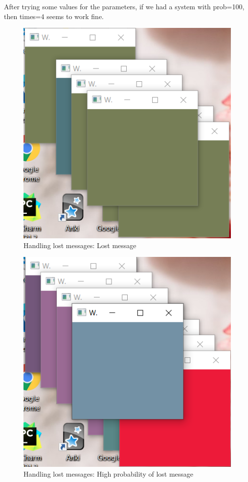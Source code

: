 \documentclass[a4paper, 11pt]{article}
\begin{document}
After trying some values for the parameters, if we had a system with prob=100, then times=4 seems to work fine.

\begin{figure}
  \begin{center}
    \includegraphics[scale=0.3]{exp2.PNG}
    \caption{Handling lost messages: Lost message}
    \label{exp2}
  \end{center}
\end{figure}


\begin{figure}
  \begin{center}
    \includegraphics[scale=0.3]{exp3.PNG}
    \caption{Handling lost messages: High probability of lost message}
    \label{exp3}
  \end{center}
\end{figure}
\end{document}
